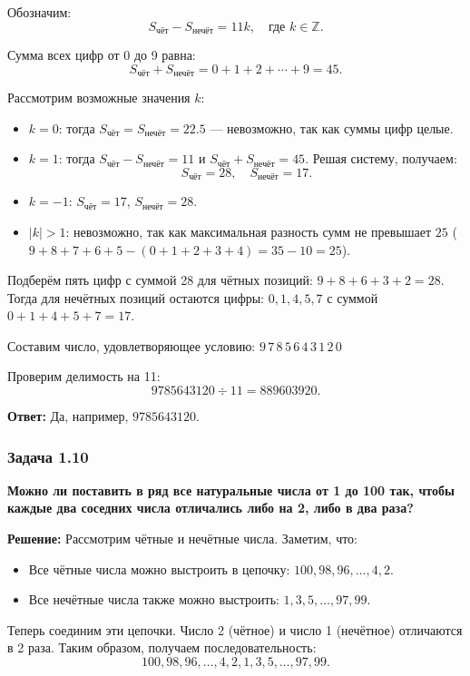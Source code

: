 \documentclass[12pt, a4paper]{article}
\begin{document}
Обозначим:
\[
S_{\text{чёт}} - S_{\text{нечёт}} = 11k,\quad \text{где } k \in \mathbb{Z}.
\]

Сумма всех цифр от 0 до 9 равна:
\[
S_{\text{чёт}} + S_{\text{нечёт}} = 0 + 1 + 2 + \cdots + 9 = 45.
\]

Рассмотрим возможные значения $k$:
\begin{itemize}
    \item $k = 0$: тогда $S_{\text{чёт}} = S_{\text{нечёт}} = 22.5$ — невозможно, так как суммы цифр целые.
    \item $k = 1$: тогда $S_{\text{чёт}} - S_{\text{нечёт}} = 11$ и $S_{\text{чёт}} + S_{\text{нечёт}} = 45$. Решая систему, получаем:
    \[
    S_{\text{чёт}} = 28,\quad S_{\text{нечёт}} = 17.
    \]
    \item $k = -1$: $S_{\text{чёт}} = 17$, $S_{\text{нечёт}} = 28$.
    \item $|k| > 1$: невозможно, так как максимальная разность сумм не превышает $25$ ($9+8+7+6+5 - (0+1+2+3+4) = 35-10=25$).
\end{itemize}

Подберём пять цифр с суммой 28 для чётных позиций: $9 + 8 + 6 + 3 + 2 = 28$. Тогда для нечётных позиций остаются цифры: $0, 1, 4, 5, 7$ с суммой $0+1+4+5+7=17$.

Составим число, удовлетворяющее условию: $9\,7\,8\,5\,6\,4\,3\,1\,2\,0$ 

Проверим делимость на 11:
\[
9785643120 \div 11 = 889603920.
\]

\textbf{Ответ:} Да, например, $9785643120$.

\subsubsection*{Задача 1.10}
\textbf{Можно ли поставить в ряд все натуральные числа от 1 до 100 так, чтобы каждые два соседних числа отличались либо на 2, либо в два раза?}

\textbf{Решение:}
Рассмотрим чётные и нечётные числа. Заметим, что:
\begin{itemize}
    \item Все чётные числа можно выстроить в цепочку: $100, 98, 96, \ldots, 4, 2$.
    \item Все нечётные числа также можно выстроить: $1, 3, 5, \ldots, 97, 99$.
\end{itemize}

Теперь соединим эти цепочки. Число 2 (чётное) и число 1 (нечётное) отличаются в 2 раза. Таким образом, получаем последовательность:
\[
100, 98, 96, \ldots, 4, 2, 1, 3, 5, \ldots, 97, 99.
\]
\end{document}
